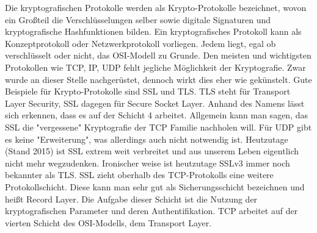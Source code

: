 Die kryptografischen Protokolle werden als Krypto-Protokolle bezeichnet, wovon ein Großteil die Verschlüsselungen selber sowie digitale Signaturen und kryptografische Hashfunktionen bilden. Ein kryptografisches Protokoll kann als Konzeptprotokoll oder Netzwerkprotokoll vorliegen. Jedem liegt, egal ob verschlüsselt oder nicht, das OSI-Modell zu Grunde. Den meisten und wichtigsten Protokollen wie TCP, IP, UDP fehlt jegliche Möglichkeit der Kryptografie. Zwar wurde an dieser Stelle nachgerüstet, dennoch wirkt dies eher wie gekünstelt. Gute Beispiele für Krypto-Protokolle sind SSL und TLS. TLS steht für Transport Layer Security, SSL dagegen für Secure Socket Layer. Anhand des Namens lässt sich erkennen, dass es auf der Schicht 4 arbeitet. Allgemein kann man sagen, das SSL die "vergessene" Kryptografie der TCP Familie nachholen will. Für UDP gibt es keine "Erweiterung", was allerdings auch nicht notwendig ist. Heutzutage (Stand 2015) ist SSL extrem weit verbreitet und aus unserem Leben eigentlich nicht mehr wegzudenken. Ironischer weise ist heutzutage SSLv3 immer noch bekannter als TLS.
SSL zieht oberhalb des TCP-Protokolls eine weitere Protokollschicht. Diese kann man sehr gut als Sicherungsschicht bezeichnen und heißt Record Layer.
Die Aufgabe dieser Schicht ist die Nutzung der kryptografischen Parameter und deren Authentifikation. TCP arbeitet auf der vierten Schicht des OSI-Modells, dem Transport Layer. \\

